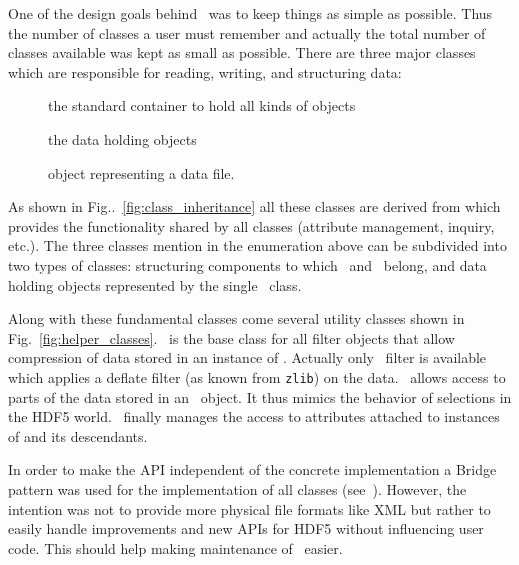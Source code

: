 One of the design goals behind \pninx\ was to keep things as simple as possible.
Thus the number of classes a user must remember and actually the total number of
classes available was kept as small as possible. 
There are three major classes which are responsible for reading, writing, and
structuring data:
\begin{description}
\item[\nxgroup] the standard container to hold all kinds of objects
\item[\nxfield] the data holding objects
\item[\nxfile] object representing a data file.
\end{description}
As shown in Fig..~\ref{fig:class_inheritance} all these classes are derived from
\nxobject which provides the functionality shared by all classes (attribute
management, inquiry, etc.).
The three classes mention in the enumeration above can be subdivided into two
types of classes: structuring components to which \nxgroup\ and \nxfield\
belong, and data holding objects represented by the single \nxfield\ class.

Along with these fundamental classes come several utility classes shown in 
Fig.~\ref{fig:helper_classes}. \nxfilter\ is the base class for all filter
objects that allow compression of data stored in an instance of \nxfield. 
Actually only \nxdeflate\ filter is available which applies a deflate filter (as
known from {\tt zlib}) on the data. \nxselection\ allows access to parts of the
data stored in an \nxfield\ object. It thus mimics the behavior of selections in
the HDF5 world. \nxattribute\ finally manages the access to attributes attached
to instances of \nxobject and its descendants.

In order to make the API independent of the concrete implementation a Bridge
pattern was used for the implementation of all classes (see~\cite{book:gof}).
However, the intention was not to provide more physical file formats like XML
but rather to easily handle improvements and new APIs for HDF5 without 
influencing user code. This should help making maintenance of \pninx\ easier.

